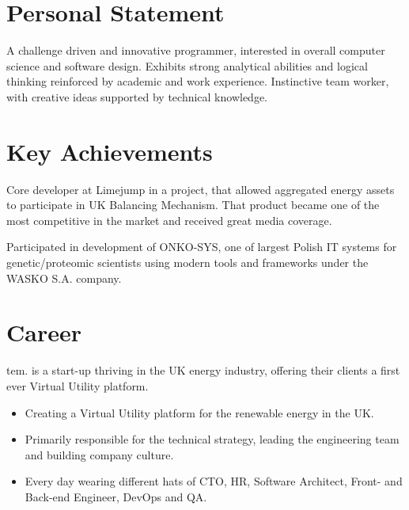 \documentclass[12pt,english]{resume}
\begin{document}

	\begin{center}


		
	\end{center}
	
	\section{Personal Statement}
		A challenge driven and innovative programmer, interested in overall computer
		science and software design. Exhibits strong analytical abilities and logical
		thinking reinforced by academic and work experience. Instinctive team worker,
		with creative ideas supported by technical knowledge.

	\section{Key Achievements}
		\noindent
		Core developer at Limejump in a project, that allowed aggregated energy assets to participate in UK Balancing Mechanism. That product became one of the most competitive in the market and received great media coverage.

		\noindent
		Participated in development of ONKO-SYS, one of largest Polish IT systems for genetic/proteomic scientists using modern tools and frameworks under the WASKO S.A. company.

	\section{Career}

		tem. is a start-up thriving in the UK energy industry, offering their clients a first ever Virtual Utility platform.

		\begin{itemize}
			\item Creating a Virtual Utility platform for the renewable energy in the UK. 
			\item Primarily responsible for the technical strategy, leading the engineering team and building company culture.
			\item Every day wearing different hats of CTO, HR, Software Architect, Front- and Back-end Engineer, DevOps and QA.
		\end{itemize}
\end{document}
